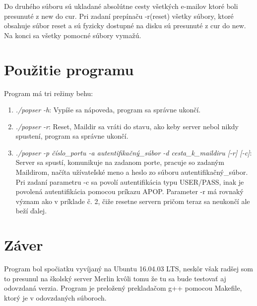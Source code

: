 \documentclass[11pt,a4paper]{article}
\begin{document}
Do druhého súboru sú ukladané absolútne cesty všetkých e-mailov ktoré boli presunuté z new do cur. Pri zadaní prepínaču -r(reset) všetky súbory, ktoré obsahuje súbor reset a sú fyzicky dostupné na disku sú presunuté z cur do new. Na konci sa všetky pomocné súbory vymažú.



\section{Použitie programu}
Program má tri režimy behu:
\begin{enumerate}
  \item \textit{./popser -h}: Vypíše sa nápoveda, program sa správne ukončí.
  \item \textit{./popser -r}: Reset, Maildir sa vráti do stavu, ako keby server nebol nikdy spustení, program sa správne ukončí.
  \item \textit{./popser -p číslo\_portu -a autentifikačný\_súbor -d  cesta\_k\_maildiru [-r] [-c]}: Server sa spustí, komunikuje na zadanom porte, pracuje so zadaným Maildirom, načíta užívateľské meno a heslo zo súboru autentifikačný\_súbor. Pri zadaní parametru -c sa povolí autentifikácia typu USER/PASS, inak je povolená autentifikácia pomocou príkazu APOP. Parameter -r má rovnaký význam ako v príklade č. 2, čiže resetne servern pričom teraz sa neukončí ale beží ďalej.
\end{enumerate}



\section{Záver}
Program bol spočiatku vyvíjaný na Ubuntu 16.04.03 LTS, neskôr však radšej som to presunul na školský server Merlin kvôli tomu že tu sa bude testovať aj odovzdaná verzia.
Program je preložený prekladačom g++ pomocou Makefile, ktorý je v odovzdaných súboroch. 


\newpage


\makeatletter
\makeatother


\begin{flushleft}

\end{flushleft}
\end{document}
